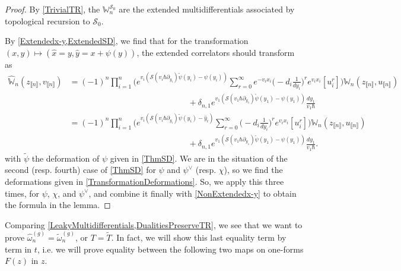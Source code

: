 \documentclass[10pt,a4paper,oneside,no-math,reqno]{amsart}%
\theoremstyle{plain}
\theoremstyle{definition}
\theoremstyle{remark}
\numberwithin{equation}{section}
\newcommand{\mb}[1]{\mathbb{#1}}
\newcommand{\mc}[1]{\mathcal{#1}}
\newcommand{\1}{\mathds{1}}
\newcommand{\<}{\langle}
\renewcommand{\>}{\rangle}
\newcommand{\del}{\partial}
\begin{document}
\begin{proof}
	By \cref{TrivialTR}, the $ \mb{W}^{\mc{S}_0}_n$ are the extended multidifferentials associated by topological recursion to $ \mc{S}_0$.

	By \cref{Extendedx-y,ExtendedSD}, we find that for the transformation $ (x, y) \mapsto (\hat{x} = y, \hat{y} = x + \psi(y))$, the extended correlators should transform as
	\begin{equation}\label{DoubleTransform}
		\begin{split}
			\hat{\mb{W}}_n (z_{\llbracket n\rrbracket}, v_{\llbracket n\rrbracket})
			&=
			(-1)^n \prod_{i=1}^n \bigg(e^{v_i ( \mc{S}(v_i\hbar \del_{y_i}) \tilde{\psi}(y_i) - \psi (y_i) )} \sum_{r=0}^\infty e^{-v_i x_i} \big( -d_i \frac{1}{dy_i} \big)^r e^{v_ix_i} [u_i^r ] \bigg) \mb{W}_n (z_{\llbracket n\rrbracket}, u_{\llbracket n\rrbracket} )
			\\
			&\hspace{6cm}
			+ \delta_{n,1} e^{v_1 ( \mc{S}(v_1\hbar \del_{y_1}) \tilde{\psi}(y_1) - \psi (y_1) )} \frac{dy_1}{v_1\hbar}
			\\
			&=
			(-1)^n \prod_{i=1}^n \bigg(e^{v_i ( \mc{S}(v_i\hbar \del_{y_i}) \tilde{\psi}(y_i) - \hat{y}_i )} \sum_{r=0}^\infty \big( -d_i \frac{1}{dy_i} \big)^r e^{v_ix_i} [u_i^r ] \bigg) \mb{W}_n (z_{\llbracket n\rrbracket}, u_{\llbracket n\rrbracket} ) 
			\\
			&\hspace{6cm}
			+ \delta_{n,1} e^{v_1 ( \mc{S}(v_1\hbar \del_{y_1}) \tilde{\psi}(y_1) - \psi (y_1) )} \frac{dy_1}{v_1\hbar} .
		\end{split}
	\end{equation}
	with $ \tilde{\psi}$ the deformation of $ \psi $ given in \cref{ThmSD}. We are in the situation of the second (resp. fourth) case of \cref{ThmSD} for $ \psi$ and $ \psi^\vee$ (resp. $\chi$), so we find the deformations given in \cref{TransformationDeformations}. So, we apply this three times, for $ \psi$, $ \chi$, and $ \psi^\vee$, and combine it finally with \cref{NonExtendedx-y} to obtain the formula in the lemma.
\end{proof}


Comparing \cref{LeakyMultidifferentials,DualitiesPreserveTR}, we see that we want to prove $ \widehat{\omega}^{(g)}_n = \tilde{\omega}^{(g)}_n$, or $ T = \tilde{T}$. In fact, we will show this last equality term by term in $t$, i.e. we will prove equality between the following two maps on one-forms $F(z)$ in $z$.
\end{document}

